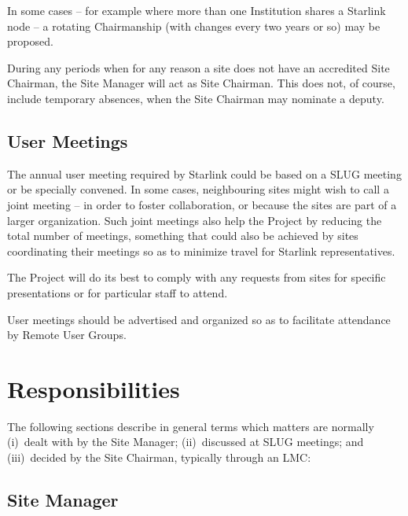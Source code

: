 In some cases -- for example where more than one Institution
shares a Starlink node -- a rotating Chairmanship (with
changes every two years or so) may be proposed.

During any periods when for any reason a site does not have
an accredited Site Chairman, the Site Manager will act as Site Chairman.
This does not, of course, include temporary absences, when the
Site Chairman may nominate a deputy.

\subsection{User Meetings}

The annual user meeting required by Starlink could be based on a SLUG
meeting or be specially convened.  In some cases, neighbouring sites
might wish to call a joint meeting -- in order to foster collaboration,
or because the sites are part of a larger organization.  Such joint
meetings also help the Project by reducing the total number of
meetings, something that could also be achieved by sites coordinating
their meetings so as to minimize travel for Starlink representatives.

The Project will do its best to comply with any requests from
sites for specific presentations or for particular staff to attend.

User meetings should be advertised and organized so as to facilitate
attendance by Remote User Groups.

\section{Responsibilities}
The following sections describe in general terms
which matters are normally (i)~dealt with by the
Site Manager; (ii)~discussed at SLUG meetings; and
(iii)~decided by the Site Chairman, typically through an LMC:

\subsection{Site Manager}

